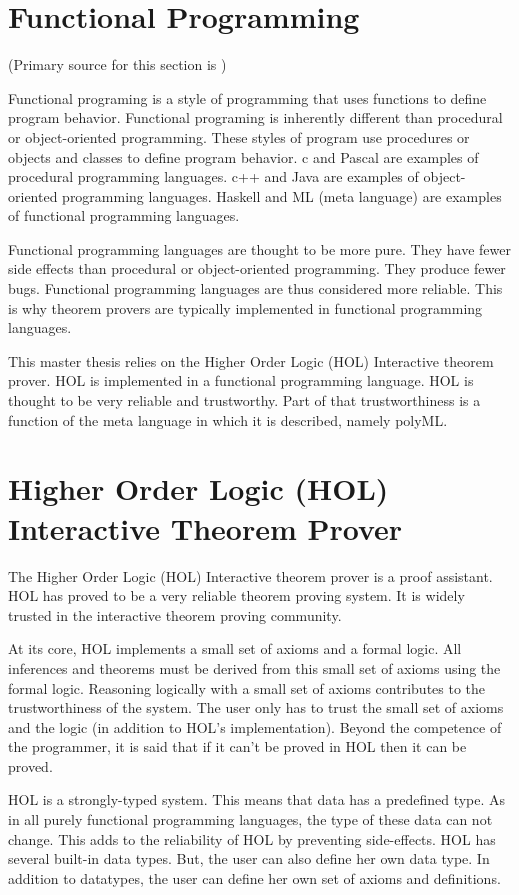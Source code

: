 \documentclass[../../main/main.tex]{subfiles}
\begin{document}
\section{Functional Programming}
(Primary source for this section is \cite{functionalprogramming})

Functional programing is a style of programming that uses functions to define program behavior.  Functional programing is inherently different than procedural or object-oriented programming. These styles of program use procedures or objects and classes to define program behavior.  c  and Pascal are examples of procedural programming languages.  c++ and Java are examples of object-oriented programming languages.  Haskell and ML (meta language) are examples of functional programming languages.  

Functional programming languages are thought to be more pure.  They have fewer side effects than procedural or object-oriented programming.  They produce fewer bugs.  Functional programming languages are thus considered more reliable. This is why theorem provers are typically implemented in functional programming languages.  

This master thesis relies on the Higher Order Logic (HOL) Interactive theorem prover.  HOL is implemented in a functional programming language.  HOL is thought to be very reliable and trustworthy.  Part of that trustworthiness is a function of the meta language in which it is described, namely polyML.

\section{Higher Order Logic (HOL) Interactive Theorem Prover}
The Higher Order Logic (HOL) Interactive theorem prover is a proof assistant.  HOL has proved to be a very reliable theorem proving system.  It is widely trusted in the interactive theorem proving community.

At its core, HOL implements a small set of axioms and a formal logic.  All inferences and theorems must be derived from this small set of axioms using the formal logic.  Reasoning logically with a small set of axioms contributes to the trustworthiness of the system.  The user only has to trust the small set of axioms and the logic (in addition to HOL's implementation).  Beyond the competence of the programmer, it is said that if it can't be proved in HOL then it can be proved.  

HOL is a strongly-typed system.  This means that data has a predefined type.  As in all purely functional programming languages, the type of these data can not change.  This adds to the reliability of HOL by preventing side-effects. HOL has several built-in data types.  But, the user can also define her own data type.   In addition to datatypes, the user can define her own set of axioms and definitions.  
\end{document}
